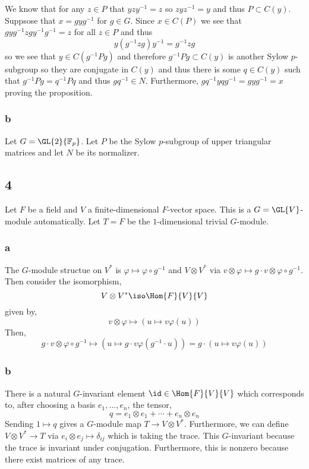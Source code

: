 \documentclass[12pt]{article}
\renewcommand{\F}{\mathbb{F}}
\begin{document}
We know that for any $z \in P$ that $y z y^{-1} = z$ so $z y z^{-1} = y$ and thus $P \subset C(y)$. Suppsose that $x = g y g^{-1}$ for $g \in G$. Since $x \in C(P)$ we see that $gyg^{-1} z g y^{-1} g^{-1} = z$ for all $z \in P$ and thus
\[ y (g^{-1} z g) y^{-1} = g^{-1} z g \]
so we see that $y \in C(g^{-1} P g)$ and therefore $g^{-1} P g \subset C(y)$ is another Sylow $p$-subgroup so they are conjugate in $C(y)$ and thus there is some $q \in C(y)$ such that $g^{-1} P g = q^{-1} P q$ and thus $g q^{-1} \in N$. Furthermore, $g q^{-1} y q g^{-1} = g y g^{-1} = x$ proving the proposition.

\subsubsection{b}

Let $G = \GL{2}{\F_p}$. Let $P$ be the Sylow $p$-subgroup of upper triangular matrices and let $N$ be its normalizer. 

\subsection{4}

Let $F$ be a field and $V$ a finite-dimensional $F$-vector space. This is a $G = \GL{V}$-module automatically. Let $T = F$ be the $1$-dimensional trivial $G$-module. 

\subsubsection{a}

The $G$-module structue on $V^*$ is $\varphi \mapsto \varphi \circ g^{-1}$ and $V \otimes V^*$ via $v \otimes \varphi \mapsto g \cdot v \otimes \varphi \circ g^{-1}$. Then consider the isomorphism,
\[ V \otimes V^* \iso \Hom{F}{V}{V} \]
given by,
\[ v \otimes \varphi \mapsto (u \mapsto v \varphi(u)) \]
Then,
\[ g \cdot v \otimes \varphi \circ g^{-1} \mapsto (u \mapsto g \cdot v \varphi(g^{-1} \cdot u)) = g \cdot (u \mapsto v \varphi(u)) \]

\subsubsection{b}

There is a natural $G$-invariant element $\id \in \Hom{F}{V}{V}$ which corresponds to, after choosing a basis $e_1, \dots, e_n$, the tensor,
\[ q = e_1 \otimes e_1 + \cdots + e_n \otimes e_n \]
Sending $1 \mapsto q$ gives a $G$-module map $T \to V \otimes V^*$. Furthermore, we can define $V \otimes V^* \to T$ via $e_i \otimes e_j \mapsto \delta_{ij}$ which is taking the trace. This $G$-invariant because the trace is invariant under conjugation. Furthermore, this is nonzero because there exist matrices of any trace. 
\end{document}
